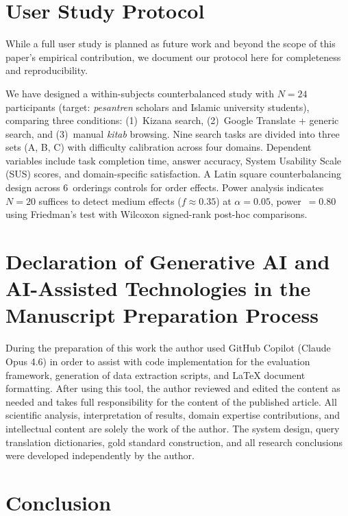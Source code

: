 \documentclass[preprint,12pt,authoryear]{elsarticle}
\begin{document}
\section{User Study Protocol}
\label{sec:user-study}

While a full user study is planned as future work and beyond the scope of this paper's empirical contribution, we document our protocol here for completeness and reproducibility.

We have designed a within-subjects counterbalanced study with $N = 24$ participants (target: \textit{pesantren} scholars and Islamic university students), comparing three conditions: (1)~Kizana search, (2)~Google Translate + generic search, and (3)~manual \textit{kitab} browsing. Nine search tasks are divided into three sets (A, B, C) with difficulty calibration across four domains. Dependent variables include task completion time, answer accuracy, System Usability Scale (SUS) scores, and domain-specific satisfaction. A Latin square counterbalancing design across 6~orderings controls for order effects. Power analysis indicates $N = 20$ suffices to detect medium effects ($f \approx 0.35$) at $\alpha = 0.05$, power~$= 0.80$ using Friedman's test with Wilcoxon signed-rank post-hoc comparisons.

\section*{Declaration of Generative AI and AI-Assisted Technologies in the Manuscript Preparation Process}

During the preparation of this work the author used GitHub Copilot (Claude Opus 4.6) in order to assist with code implementation for the evaluation framework, generation of data extraction scripts, and LaTeX document formatting. After using this tool, the author reviewed and edited the content as needed and takes full responsibility for the content of the published article. All scientific analysis, interpretation of results, domain expertise contributions, and intellectual content are solely the work of the author. The system design, query translation dictionaries, gold standard construction, and all research conclusions were developed independently by the author.

\section{Conclusion}
\label{sec:conclusion}
\end{document}
